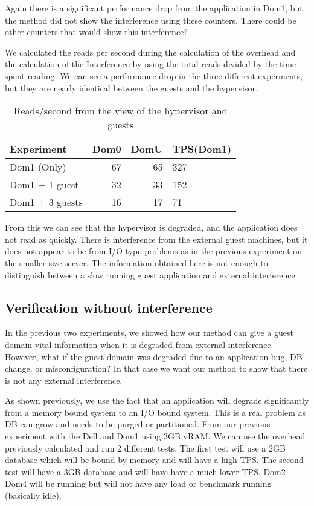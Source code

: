 Again there is a significant performance drop from the application in Dom1, but the method did not show the interference using these counters.  There could be other counters that would show this interference?   

We calculated the reads per second during the calculation of the overhead and the calculation of the Interference by using the total reads divided by the time spent reading.  We can see a performance drop in the three different experments, but they are nearly identical between the guests and the hypervisor.  

\begin{table}[!h]
\begin{tabular}{ l r r p{5cm} }
	Experiment     & Dom0 & DomU  & TPS(Dom1) \\
	\hline
    Dom1 (Only)    & 67 & 65 & 327 \\
    Dom1 + 1 guest & 32 & 33 & 152 \\
    Dom1 + 3 guests& 16 & 17 &  71 \\
\end{tabular}
\caption{Reads/second from the view of the hypervisor and guests}
\end{table}

From this we can see that the hypervisor is degraded, and the application does not read as quickly.  There is interference from the external guest machines, but it does not appear to be from I/O type problems as in the previous experiment on the smaller size server. The information obtained here is not enough to distinguish between a slow running guest application and external interference.


\subsection{Verification without interference}
In the previous two experiments, we showed how our method can give a guest domain vital information when it is degraded from external interference.  However, what if the guest domain was degraded due to an application bug, DB change, or misconfiguration?   In that case we want our method to show that there is not any external interference.

\indent As shown previously, we use the fact that an application will degrade significantly from a memory bound system to an I/O bound system.  This is a real problem as DB can grow and needs to be purged or partitioned.  From our previous experiment with the Dell and Dom1 using 3GB vRAM.  We can use the overhead previously calculated and run 2 different tests.  The first test will use a 2GB database which will be bound by memory and will have a high TPS. The second test will have a 3GB database and will have have a much lower TPS.  Dom2 - Dom4 will be running but will not have any load or benchmark running (basically idle).








